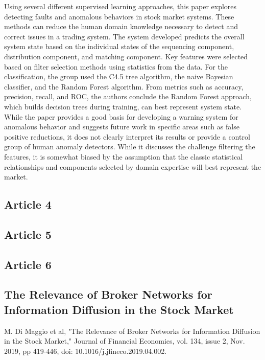 \documentclass[12pt]{article}
\begin{document}
Using several different supervised learning approaches, this paper explores detecting faults and anomalous behaviors in stock market systems. These methods can reduce the human domain knowledge necessary to detect and correct issues in a trading system. The system developed predicts the overall system state based on the individual states of the sequencing component, distribution component, and matching component. Key features were selected based on filter selection methods using statistics from the data. For the classification, the group used the C4.5 tree algorithm, the naive Bayesian classifier, and the Random Forest algorithm. From metrics such as accuracy, precision, recall, and ROC, the authors conclude the Random Forest approach, which builds decision trees during training, can best represent system state. While the paper provides a good basis for developing a warning system for anomalous behavior and suggests future work in specific areas such as false positive reductions, it does not clearly interpret its results or provide a control group of human anomaly detectors. While it discusses the challenge filtering the features, it is somewhat biased by the assumption that the classic statistical relationships and components selected by domain expertise will best represent the market.


\subsection{Article 4}

\subsection{Article 5}

\subsection{Article 6}

\subsection{The Relevance of Broker Networks for Information Diffusion in the Stock Market}
M. Di Maggio et al, "The Relevance of Broker Networks for Information Diffusion in the Stock Market," Journal of Financial Economics, vol. 134, issue 2, Nov. 2019, pp 419-446, doi: 10.1016/j.jfineco.2019.04.002.
\end{document}
